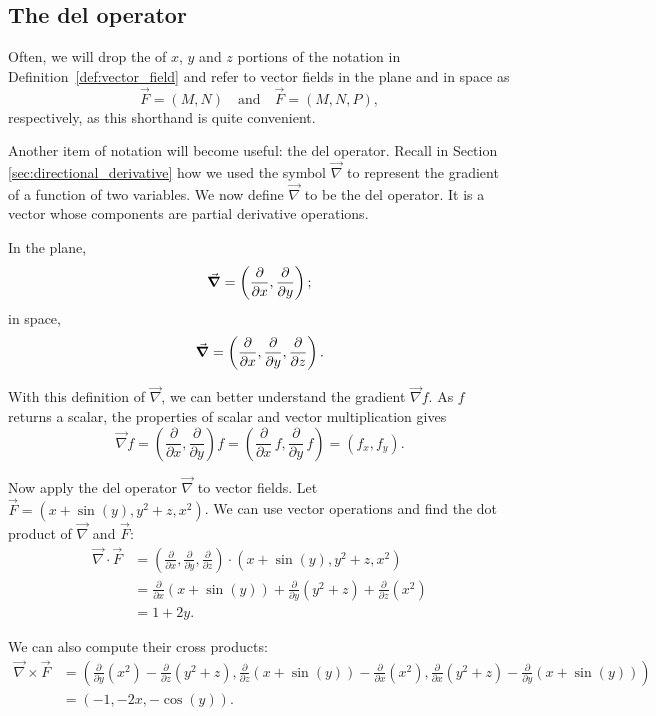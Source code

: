 \subsection{The del operator}
Often, we will drop the of $x$, $y$ and $z$ portions of the notation in Definition~\ref{def:vector_field} and refer to vector fields in the plane and in space as 
$$\vec F = \left( M, N\right) \quad \text{and} \quad \vec F  = \left( M,N,P\right),$$ respectively, as this shorthand is quite convenient.

Another item of notation will become useful: the del operator. Recall in Section \ref{sec:directional_derivative} how we used the symbol $\vec{\nabla}$  to represent the gradient of a function of two variables. We now define $\vec{\nabla}$ to be the del operator. It is a vector whose components are partial derivative operations. 

In the plane, 
$$\ds\vec{\nabla} = \left( \frac{\partial}{\partial x}, \frac{\partial}{\partial y}\right);$$
in space, 
$$\ds\vec{\nabla} = \left( \frac{\partial}{\partial x}, \frac{\partial}{\partial y},\frac{\partial}{\partial z}\right).$$ 

With this definition of $\vec{\nabla}$, we can better understand the gradient $\vec{\nabla} f$. As $f$ returns a scalar, the properties of scalar and vector multiplication gives
$$\vec{\nabla} f = \left( \frac{\partial}{\partial x}, \frac{\partial}{\partial y}\right) f = \left( \frac{\partial}{\partial x}\,f, \frac{\partial}{\partial y}\,f\right) = \left( f_x, f_y\right).$$

Now apply the del operator $\vec{\nabla}$ to vector fields. Let $\vec F = \left( x+\sin(y),y^2+z,x^2\right)$. We can use vector operations and find the dot product of $\vec{\nabla}$ and $\vec F$:
\allowdisplaybreaks
\begin{align*}
\vec{\nabla} \cdot \vec F &=\left( \frac{\partial}{\partial x}, \frac{\partial}{\partial y},\frac{\partial}{\partial z}\right)\cdot  \left( x+\sin(y),y^2+z,x^2\right) \\
  &= \frac{\partial}{\partial x}\left(x+\sin(y)\right)+ \frac{\partial}{\partial y}\left(y^2+z\right) + \frac{\partial}{\partial z}\left(x^2\right) \\
		&=1+2y.
\end{align*}

We can also compute their cross products:
\allowdisplaybreaks
\begin{align*}
{\vec{\nabla}\times \vec F }&= {\left( \frac{\partial}{\partial y}\left(x^2\right)-\frac{\partial}{\partial z}\left(y^2+z\right),\frac{\partial}{\partial z}\left(x+\sin(y)\right)-\frac{\partial}{\partial x}\left(x^2\right),\frac{\partial}{\partial x}\left(y^2+z\right)-\frac{\partial}{\partial y}\left(x+\sin (y)\right)\right) }\\
			&=\left( -1,-2x,-\cos(y)\right).
\end{align*}\normalsize

